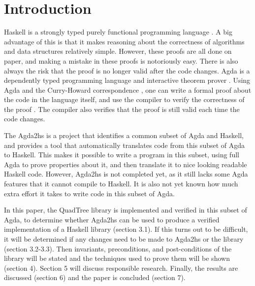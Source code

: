 \section{Introduction}
Haskell is a strongly typed purely functional programming language \cite{haskell}. A big advantage of this is that it makes reasoning about the correctness of algorithms and data structures relatively simple. However, these proofs are all done on paper, and making a mistake in these proofs is notoriously easy. There is also always the risk that the proof is no longer valid after the code changes. Agda is a dependently typed programming language and interactive theorem prover \cite{agda}.  Using Agda and the Curry-Howard correspondence \cite{chc}, one can write a formal proof about the code in the language itself, and use the compiler to verify the correctness of the proof \cite{schwaab, van}. The compiler also verifies that the proof is still valid each time the code changes.

The Agda2hs \cite{agda2hs} is a project that identifies a common subset of Agda and Haskell, and provides a tool that automatically translates code from this subset of Agda to Haskell. This makes it possible to write a program in this subset, using full Agda to prove properties about it, and then translate it to nice looking readable Haskell code. However, Agda2hs is not completed yet, as it still lacks some Agda features that it cannot compile to Haskell. It is also not yet known how much extra effort it takes to write code in this subset of Agda.

In this paper, the QuadTree library is implemented and verified in this subset of Agda, to determine whether Agda2hs can be used to produce a verified implementation of a Haskell library (section 3.1). If this turns out to be difficult, it will be determined if any changes need to be made to  Agda2hs or the library (section 3.2-3.3). Then invariants, preconditions, and post-conditions of the library will be stated and the techniques used to prove them will be shown (section 4). Section 5 will discuss responsible research. Finally, the results are discussed (section 6) and the paper is concluded (section 7).
